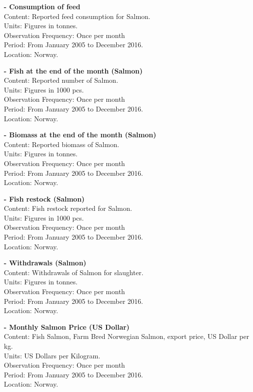 \textbf{- Consumption of feed}
	\\ Content: Reported feed consumption for Salmon.
	\\ Units: Figures in tonnes.
	\\ Observation Frequency: Once per month
	\\ Period:  From January 2005 to December 2016.
	\\ Location: Norway.


\textbf{- Fish at the end of the month (Salmon)}
	\\ Content: Reported number of Salmon. 
	\\ Units: Figures in 1000 pcs.
	\\ Observation Frequency: Once per month
	\\ Period:  From January 2005 to December 2016.
	\\ Location: Norway.

\textbf{- Biomass at the end of the month (Salmon)}
	\\ Content: Reported biomass of Salmon. 
	\\ Units: Figures in tonnes.
	\\ Observation Frequency: Once per month
	\\ Period:  From January 2005 to December 2016.
	\\ Location: Norway.
	
\textbf{- Fish restock (Salmon)}
	\\ Content: Fish restock reported for Salmon.
	\\ Units: Figures in 1000 pcs.
	\\ Observation Frequency: Once per month
	\\ Period:  From January 2005 to December 2016.
	\\ Location: Norway.


\textbf{- Withdrawals (Salmon)}
	\\ Content: Withdrawals of Salmon for slaughter. 
	\\ Units: Figures in tonnes.
	\\ Observation Frequency: Once per month
	\\ Period:  From January 2005 to December 2016.
	\\ Location: Norway.


\textbf{- Monthly Salmon Price (US Dollar)}
	\\ Content: Fish Salmon, Farm Bred Norwegian Salmon, export price, US Dollar per kg. 
	\\ Units: US Dollars per Kilogram. 
	\\ Observation Frequency: Once per month
	\\ Period:  From January 2005 to December 2016.
	\\ Location: Norway.
	
